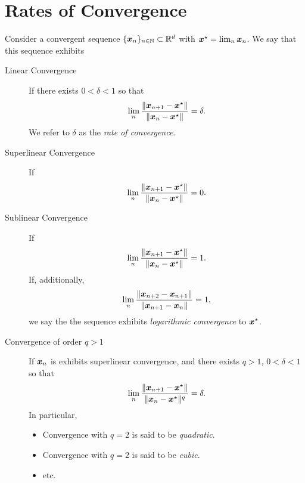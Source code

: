 
\chapter{Rates of Convergence}\label{appendix:convergence}

\begin{definition}
Consider a convergent sequence $\{ \boldsymbol{x}_n \}_{n\in\mathbb{N}} \subset \mathbb{R}^d$ with $\boldsymbol{x}^{\star}=\lim_n \boldsymbol{x}_n$.  We say that this sequence exhibits
\begin{description}
	\item [Linear Convergence] If there exists $0<\delta<1$ so that 
	\begin{equation*}
	\lim_n \frac{\lVert \boldsymbol{x}_{n+1} - \boldsymbol{x}^{\star} \rVert}{\lVert \boldsymbol{x}_n - \boldsymbol{x}^{\star} \rVert}=\delta.
	\end{equation*}
	We refer to $\delta$ as the \emph{rate of convergence}.
	\item [Superlinear Convergence] If 
	\begin{equation*}
	\lim_n \frac{\lVert \boldsymbol{x}_{n+1} - \boldsymbol{x}^{\star} \rVert}{\lVert \boldsymbol{x}_n - \boldsymbol{x}^{\star} \rVert}=0.
	\end{equation*}
	\item [Sublinear Convergence] If
	\begin{equation*}
	\lim_n \frac{\lVert \boldsymbol{x}_{n+1} - \boldsymbol{x}^{\star} \rVert}{\lVert \boldsymbol{x}_n - \boldsymbol{x}^{\star} \rVert}=1.
	\end{equation*}
	If, additionally, 
	\begin{equation*}
	\lim_n \frac{\lVert \boldsymbol{x}_{n+2} - \boldsymbol{x}_{n+1} \rVert}{\lVert \boldsymbol{x}_{n+1} - \boldsymbol{x}_n \rVert}=1,
	\end{equation*}
	we say the the sequence exhibits \emph{logarithmic convergence} to $\boldsymbol{x}^{\star}$.
	\item [Convergence of order $q>1$] If $\boldsymbol{x}_n$ is exhibits superlinear convergence, and there exists $q>1$, $0<\delta<1$ so that 
	\begin{equation*}
	\lim_n \frac{\lVert \boldsymbol{x}_{n+1} - \boldsymbol{x}^{\star} \rVert}{\lVert \boldsymbol{x}_n - \boldsymbol{x}^{\star} \rVert^q}=\delta.
	\end{equation*}
	In particular, 
	\begin{itemize}
		\item Convergence with $q=2$ is said to be \emph{quadratic}.
		\item Convergence with $q=2$ is said to be \emph{cubic}.
		\item etc.
	\end{itemize}
\end{description}
\end{definition}

